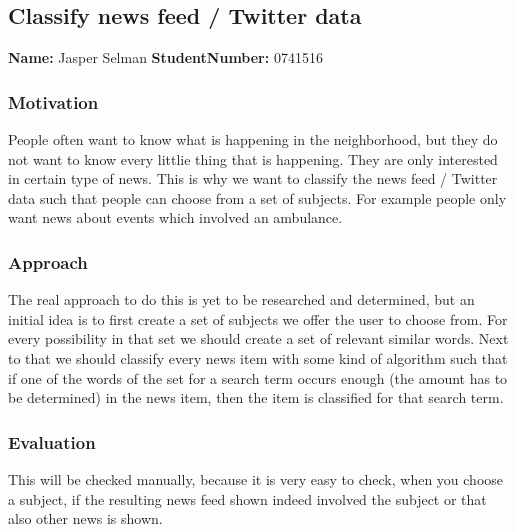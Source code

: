 \subsection{Classify news feed / Twitter data}
\textbf{Name:} Jasper Selman \indent \textbf{StudentNumber:} 0741516

\subsubsection*{Motivation}
People often want to know what is happening in the neighborhood, but they do not want to know every littlie thing that is happening.
They are only interested in certain type of news. This is why we want to classify the news feed / Twitter data such that people can choose from a set of subjects. For example people only want news about events which involved an ambulance. 

\subsubsection*{Approach}
The real approach to do this is yet to be researched and determined, but an initial idea is to first create a set of subjects we offer the user to choose from. For every possibility in that set we should create a set of relevant similar words. Next to that we should classify every news item with some kind of algorithm such that if one of the words of the set for a search term occurs enough (the amount has to be determined) in the news item, then the item is classified for that search term.

\subsubsection*{Evaluation }
This will be checked manually, because it is very easy to check, when you choose a subject, if the resulting news feed shown indeed involved the subject or that also other news is shown.
